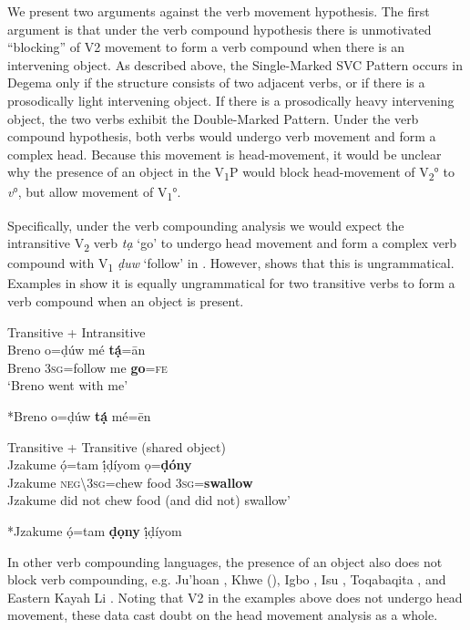 \documentclass[output=paper]{langsci/langscibook}
\begin{document}
We present two arguments against the verb movement hypothesis. The first argument is that under the verb compound hypothesis there is unmotivated “blocking” of V2 movement to form a verb compound when there is an intervening object. As described above, the Single-Marked SVC Pattern occurs in Degema only if the structure consists of two adjacent verbs, or if there is a prosodically light intervening object. If there is a prosodically heavy intervening object, the two verbs exhibit the Double-Marked Pattern. Under the verb compound hypothesis, both verbs would undergo verb movement and form a complex head. Because this movement is head-movement, it would be unclear why the presence of an object in the V\textsubscript{1}P would block head-movement of V\textsubscript{2}° to \textit{v}°, but allow movement of V\textsubscript{1}°.

Specifically, under the verb compounding analysis we would expect the intransitive V\textsubscript{2} verb \textit{tạ} ‘go’ to undergo head movement and form a complex verb compound with V\textsubscript{1} \textit{ḍuw} ‘follow’ in . However,  shows that this is ungrammatical. Examples in  show it is equally ungrammatical for two transitive verbs to form a verb compound when an object is present. 

\ea\label{ex:rolle:tran}
{Transitive + Intransitive}\\
\ea\label{ex:rolle:37}
\gll   Breno   o=ḍúw    mé   \textbf{tạ́}=ān\\
     Breno   3\textsc{sg}=follow   me   \textbf{go}=\textsc{fe}\\
\glt ‘Breno went with me’ \citep[115]{Kari2004}

\ex\label{ex:rolle:38}
  *Breno o=ḍúw  \textbf{tạ́}  mé=ēn\\
\z
\z 

\ea\label{ex:rolle:so}
{Transitive + Transitive (shared object)}\\
   \ea\label{ex:rolle:39}
\gll   Jzakume   ọ́=tam      ị́ḍíyom  ọ=\textbf{ḍóny}\\
     Jzakume  \textsc{neg{\textbackslash}}3\textsc{sg}=chew  food  3\textsc{sg}=\textbf{swallow}\\
\glt Jzakume did not chew food (and did not) swallow’ \citep[110]{Kari2004}

\ex\label{ex:rolle:40}
   *Jzakume  ọ́=tam  \textbf{ḍọny}  ị́ḍíyom\\
\z
\z 


In other verb compounding languages, the presence of an object also does not block verb compounding, e.g. Ju{\textbar}’hoan \citep{Collins2002}, Khwe (\citealt{KilianHatz2006}), Igbo \citep{Lord1975}, Isu \citep{Kießling2011}, Toqabaqita \citep{Lichtenberk2006,Lichtenberk2008}, and Eastern Kayah Li \citep{Solnit2006}. Noting that V2 in the examples above does not undergo head movement, these data cast doubt on the head movement analysis as a whole.
\end{document}
